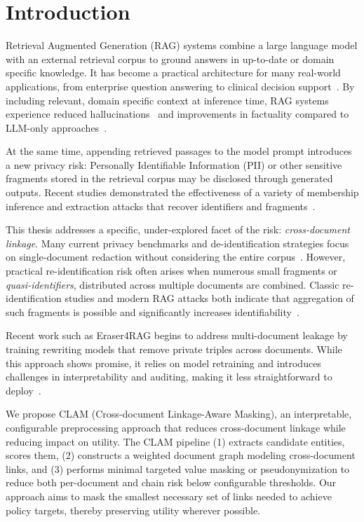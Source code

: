 
\section{Introduction}\label{sec:introduction}

Retrieval Augmented Generation (RAG) systems combine a large language model with an external retrieval corpus to ground answers in up-to-date or domain specific knowledge. It has become a practical architecture for many real-world applications, from enterprise question answering to clinical decision support~\cite{chatDoctor}. By including relevant, domain specific context at inference time, RAG systems experience reduced hallucinations~\cite{ragNoHallucination} and improvements in factuality compared to LLM-only approaches~\cite{ragOrigin}.

At  the same time, appending retrieved passages to the model prompt introduces a new privacy risk: Personally Identifiable Information (PII) or other sensitive fragments stored in the retrieval corpus may be disclosed through generated outputs. Recent studies demonstrated the effectiveness of a variety of membership inference and extraction attacks that recover identifiers and fragments~\cite{ragMIA, ragThief,generatingIsBelieving,goodAndBad,DEAL}. 

This thesis addresses a specific, under-explored facet of the risk: \textit{cross-document linkage}. Many current privacy benchmarks and de-identification strategies focus on single-document redaction without considering the entire corpus~\cite{LPRAG,DPVoteRAG,ragSAGE}. However, practical re-identification risk often arises when numerous small fragments or \textit{quasi-identifiers}, distributed across multiple documents are combined. Classic re-identification studies and modern RAG attacks both indicate that aggregation of such fragments is possible and significantly increases identifiability~\cite{ragThief,netflixDeAnon, simpleDemographic}.

Recent work such as Eraser4RAG begins to address multi-document leakage by training rewriting models that remove private triples across documents. While this approach shows promise, it relies on model retraining and introduces challenges in interpretability and auditing, making it less straightforward to deploy~\cite{eraser4RAG}.

We propose CLAM (Cross-document Linkage-Aware Masking), an interpretable, configurable preprocessing approach that reduces cross-document linkage while reducing impact on utility. The CLAM pipeline (1) extracts candidate entities, scores them, (2) constructs a weighted document graph modeling cross-document links, and (3) performs minimal targeted value masking or pseudonymization to reduce both per-document and chain risk below configurable thresholds. Our approach aims to mask the smallest necessary set of links needed to achieve policy targets, thereby preserving utility wherever possible.

